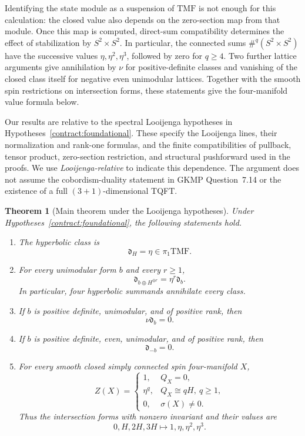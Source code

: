 \documentclass[11pt,a4paper]{amsart}
\newcommand{\TMF}{\mathrm{TMF}}
\newcommand{\dclass}{\mathfrak d}
\theoremstyle{plain}
\newtheorem{theorem}{Theorem}[section]
\theoremstyle{definition}
\theoremstyle{remark}
\begin{document}
Identifying the state module as a suspension of $\TMF$ is not
enough for this calculation: the closed value also depends on
the zero-section map from that module. Once this map is computed,
direct-sum compatibility determines the effect of stabilization
by $S^2\times S^2$. In particular, the connected sums
$\#^q(S^2\times S^2)$ have the successive values
$\eta,\eta^2,\eta^3$, followed by zero for $q\ge4$.
Two further lattice arguments give annihilation by $\nu$ for
positive-definite classes and vanishing of the closed class itself
for negative even unimodular lattices. Together with the smooth
spin restrictions on intersection forms, these statements give
the four-manifold value formula below.

Our results are relative to the spectral Looijenga hypotheses in
Hypotheses~\ref{contract:foundational}. These specify the Looijenga
lines, their normalization and rank-one formulas, and the finite
compatibilities of pullback, tensor product, zero-section restriction,
and structural pushforward used in the proofs. We use
\emph{Looijenga-relative} to indicate this dependence.
The argument does not assume the cobordism-duality statement in
GKMP Question~7.14 or the existence of a full $(3+1)$-dimensional TQFT.

\begin{theorem}[Main theorem under the Looijenga hypotheses]\label{thm:intro-main}
Under Hypotheses~\ref{contract:foundational}, the following
statements hold.
\begin{enumerate}[label=\textup{(\roman*)},leftmargin=2.8em]
\item The hyperbolic class is
\[
 \dclass_H=\eta\in\pi_1\TMF.
\]
\item For every unimodular form $b$ and every $r\ge1$,
\[
 \dclass_{b\oplus H^{\oplus r}}=\eta^r\dclass_b.
\]
In particular, four hyperbolic summands annihilate every class.
\item If $b$ is positive definite, unimodular, and of positive rank, then
\[
 \nu\dclass_b=0.
\]
\item If $b$ is positive definite, even, unimodular, and of positive rank, then
\[
 \dclass_{-b}=0.
\]
\item For every smooth closed simply connected spin four-manifold $X$,
\[
 Z(X)=
 \begin{cases}
  1,&Q_X=0,\\
  \eta^q,&Q_X\cong qH,\ q\ge1,\\
  0,&\sigma(X)\ne0.
 \end{cases}
\]
Thus the intersection forms with nonzero invariant and their
values are
\[
 0,H,2H,3H\longmapsto1,\eta,\eta^2,\eta^3.
\]
\end{enumerate}
\end{theorem}
\end{document}
